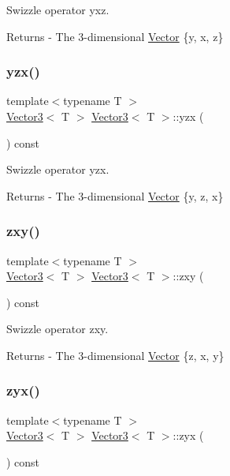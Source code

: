 Swizzle operator yxz. \begin{DoxyReturn}{Returns}
-\/ The 3-\/dimensional \mbox{\hyperlink{class_vector}{Vector}} \{y, x, z\} 
\end{DoxyReturn}
\mbox{\label{class_vector3_a678d9ca488ba19d592965d0094bd685f}} 
\subsubsection{\texorpdfstring{yzx()}{yzx()}}
{\footnotesize\ttfamily template$<$typename T $>$ \\
\mbox{\hyperlink{class_vector3}{Vector3}}$<$ T $>$ \mbox{\hyperlink{class_vector3}{Vector3}}$<$ T $>$\+::yzx (\begin{DoxyParamCaption}{ }\end{DoxyParamCaption}) const}

Swizzle operator yzx. \begin{DoxyReturn}{Returns}
-\/ The 3-\/dimensional \mbox{\hyperlink{class_vector}{Vector}} \{y, z, x\} 
\end{DoxyReturn}
\mbox{\label{class_vector3_a325fdcf29fb440716dcb22583822e3b4}} 
\subsubsection{\texorpdfstring{zxy()}{zxy()}}
{\footnotesize\ttfamily template$<$typename T $>$ \\
\mbox{\hyperlink{class_vector3}{Vector3}}$<$ T $>$ \mbox{\hyperlink{class_vector3}{Vector3}}$<$ T $>$\+::zxy (\begin{DoxyParamCaption}{ }\end{DoxyParamCaption}) const}

Swizzle operator zxy. \begin{DoxyReturn}{Returns}
-\/ The 3-\/dimensional \mbox{\hyperlink{class_vector}{Vector}} \{z, x, y\} 
\end{DoxyReturn}
\mbox{\label{class_vector3_a43ee17c0dffc0290b18db9464c802be9}} 
\subsubsection{\texorpdfstring{zyx()}{zyx()}}
{\footnotesize\ttfamily template$<$typename T $>$ \\
\mbox{\hyperlink{class_vector3}{Vector3}}$<$ T $>$ \mbox{\hyperlink{class_vector3}{Vector3}}$<$ T $>$\+::zyx (\begin{DoxyParamCaption}{ }\end{DoxyParamCaption}) const}

